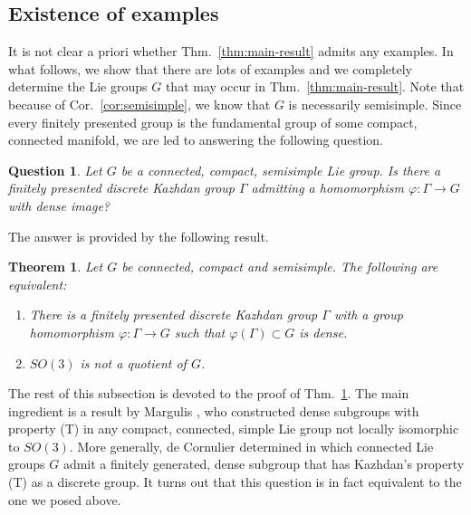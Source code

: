 \documentclass[11pt, letterpaper, oneside,reqno]{amsart}
\theoremstyle{plain}
\newtheorem{thm}{Theorem}[section]
\newtheorem*{question}{Question}
\theoremstyle{underline}
\theoremstyle{definition}
\theoremstyle{remark}
\begin{document}
	\subsection{Existence of examples}
	It is not clear a priori whether Thm.~\ref{thm:main-result} admits any examples. In what follows, we show that there are lots of examples and we completely determine the Lie groups $G$ that may occur in Thm.~\ref{thm:main-result}. Note that because of Cor.~\ref{cor:semisimple}, we know that $G$ is necessarily semisimple. Since every finitely presented group is the fundamental group of some compact, connected manifold, we are led to answering the following question.
	
	\begin{question}
		Let $G$ be a connected, compact, semisimple Lie group. Is there a finitely presented discrete Kazhdan group $\Gamma$ admitting a homomorphism $\varphi:\Gamma\rightarrow G$ with dense image?
	\end{question}
	
	The answer is provided by the following result.
	
	\begin{thm}\label{thm:no-so3}
		Let $G$ be connected, compact and semisimple. The following are equivalent:
		\begin{enumerate}
			\item There is a finitely presented discrete Kazhdan group $\Gamma$ with a group homomorphism $\varphi:\Gamma\rightarrow G$ such that $\varphi(\Gamma)\subset G$ is dense.
			\item $SO(3)$ is not a quotient of $G$.
		\end{enumerate}
	\end{thm}
	
	
	The rest of this subsection is devoted to the proof of Thm.~\ref{thm:no-so3}. The main ingredient is a result by Margulis \cite[Chapter~III, Proof of Prop.~7]{Margulis}, who constructed dense subgroups with property (T) in any compact, connected, simple Lie group not locally isomorphic to $SO(3)$. More generally, de Cornulier determined in \cite{Cornulier} which connected Lie groups $G$ admit a finitely generated, dense subgroup that has Kazhdan's property (T) as a discrete group. It turns out that this question is in fact equivalent to the one we posed above.
	
\end{document}
